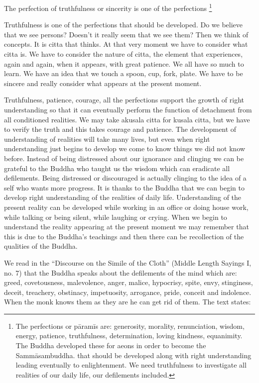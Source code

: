 {{{{{{{{{{{The perfection of truthfulness or
sincerity is one of the perfections
\footnote{The perfections or pāramīs are:
generosity, morality, renunciation, wisdom, energy, patience,
truthfulness, determination, loving kindness, equanimity. The Buddha
developed these for aeons in order to become the Sammāsambuddha.
that should be developed along with right understanding leading
eventually to enlightenment. We need truthfulness to investigate all
realities of our daily life, our defilements included.}

Truthfulness is one of the perfections
that should be developed. Do we believe that we see persons? Doesn't it
really seem that we see them? Then we think of concepts. It is citta
that thinks. At that very moment we have to consider what citta is. We
have to consider the nature of citta, the element that experiences,
again and again, when it appears, with great patience. We all have so
much to learn. We have an idea that we touch a spoon, cup, fork, plate.
We have to be sincere and really consider what appears at the present
moment.~

Truthfulness, patience, courage, all
the perfections support the growth of right understanding so that it can
eventually perform the function of detachment from all conditioned
realities. We may take akusala citta for kusala citta, but we have to
verify the truth and this takes courage and patience. The development of
understanding of realities will take many lives, but even when right
understanding just begins to develop we come to know things we did not
know before. Instead of being distressed about our ignorance and
clinging we can be grateful to the Buddha who taught us the wisdom which
can eradicate all defilements. Being distressed or discouraged is
actually clinging to the idea of a self who wants more progress. It is
thanks to the Buddha that we can begin to develop right understanding of
the realities of daily life. Understanding of the present reality can be
developed while working in an office or doing house work, while talking
or being silent, while laughing or crying. When we begin to understand
the reality appearing at the present moment we may remember that this is
due to the Buddha's teachings and then there can be recollection of the
qualities of the Buddha.

We read in the ``Discourse on the
Simile of the Cloth'' (Middle Length Sayings I, no. 7) that the Buddha
speaks about the defilements of the mind which are: greed, covetousness,
malevolence, anger, malice, hypocrisy, spite, envy, stinginess, deceit,
treachery, obstinacy, impetuosity, arrogance, pride, conceit and
indolence. When the monk knows them as they are he can get rid of them.
The text states:

}}}}}}}}}}}
